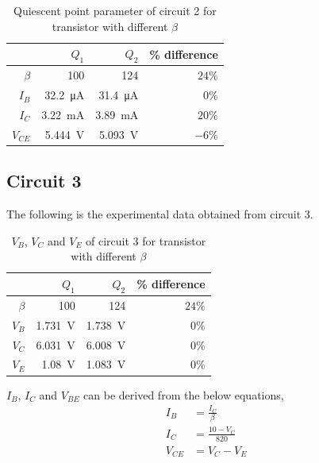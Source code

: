 \documentclass{article}
\begin{document}
\begin{table}[H]
  \caption{Quiescent point parameter of circuit 2 for transistor with different $\beta$}
  \centering
    \begin{tabular}{rrrr}
      \toprule
       &$Q_1$&$Q_2$&\% difference\\
      \midrule
      $\beta$&100&124&$24\%$\\
      $I_B$&\SI{32.2}{\micro\ampere}&\SI{31.4}{\micro\ampere}&$0\%$\\
      $I_C$&\SI{3.22}{\milli\ampere}&\SI{3.89}{\milli\ampere}&$20\%$\\
      $V_{CE}$&\SI{5.444}{\volt}&\SI{5.093}{\volt}&$-6\%$\\
    \bottomrule
  \end{tabular}
  \label{tab:ckt2_calc}%
\end{table}

\newpage

\subsection*{Circuit 3}
The following is the experimental data obtained from circuit 3.

\begin{table}[H]
  \caption{$V_B$, $V_C$ and $V_E$ of circuit 3 for transistor with different $\beta$}
  \centering
    \begin{tabular}{rrrr}
      \toprule
       &$Q_1$&$Q_2$&\% difference\\
      \midrule
      $\beta$&100&124&$24\%$\\
      $V_B$&\SI{1.731}{\volt}&\SI{1.738}{\volt}&$0\%$\\
      $V_C$&\SI{6.031}{\volt}&\SI{6.008}{\volt}&$0\%$\\
      $V_E$&\SI{1.08 }{\volt}&\SI{1.083}{\volt}&$0\%$\\
    \bottomrule
  \end{tabular}
  \label{tab:ckt3_exp}%
\end{table}

$I_B$, $I_C$ and $V_{BE}$ can be derived from the below equations,
\begin{align}\label{eqn:ckt3_2}
  I_B    &= \frac{I_C}{\beta}\\
  I_C    &= \frac{10-V_C}{820}\\
  V_{CE} &= V_C-V_E
\end{align}
\end{document}
